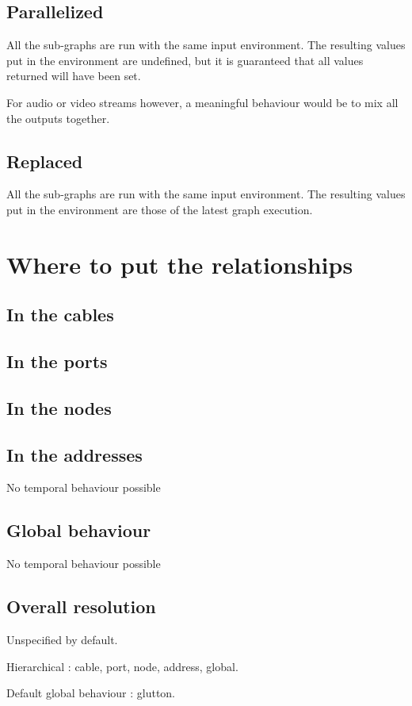 \documentclass{article}
\begin{document}
	
	\subsection{Parallelized}
	All the sub-graphs are run with the same input environment. 
	The resulting values put in the environment are undefined, but it is guaranteed that all values returned will have been set.
	
    For audio or video streams however, a meaningful behaviour would be to mix all the outputs together.
     
	\subsection{Replaced}
	All the sub-graphs are run with the same input environment. 
	The resulting values put in the environment are those of the latest graph execution.
	
    
    \section{Where to put the relationships}
    \subsection{In the cables}
    \subsection{In the ports}
    \subsection{In the nodes}
    \subsection{In the addresses}
    No temporal behaviour possible
    \subsection{Global behaviour}
    No temporal behaviour possible
    \subsection{Overall resolution}
    Unspecified by default. 
    
    Hierarchical : cable, port, node, address, global.
    
    Default global behaviour : glutton.
    
\end{document}
